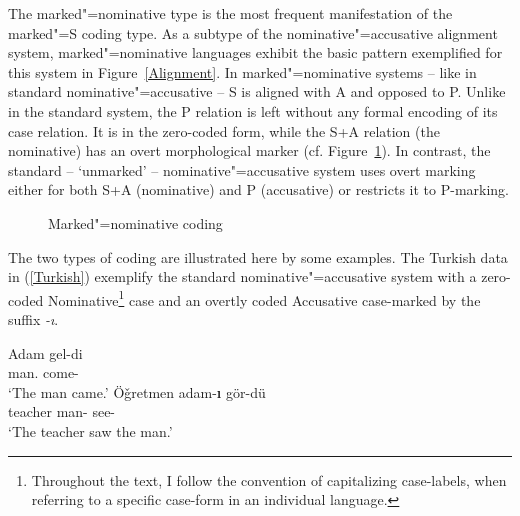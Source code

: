 The marked"=nominative  type is the most frequent manifestation of the marked"=S coding type. 
As a subtype of the nominative"=accusative alignment system, marked"=nominative languages exhibit the basic pattern exemplified for this system in Figure~\ref{Alignment}. 
In marked"=nominative systems -- like in standard nominative"=accusative -- S is aligned with A and opposed to P. 
Unlike in the standard system, the P relation is left without any formal encoding of its case relation. 
It is in the zero-coded form, while the S+A relation (the nominative) has an overt morphological marker (cf. Figure~\ref{MN alignment}). 
In contrast, the standard -- `unmarked' -- nominative"=accusative system uses overt marking either for both S+A (nominative) and P (accusative) or restricts it to P-marking. 

\begin{figure}[h]\begin{center}
\caption{Marked"=nominative coding}\label{MN alignment}
\end{center}
\end{figure}

The two types of coding are illustrated here by some examples.
The Turkish data in (\ref{Turkish}) exemplify the standard nominative"=accusative system with a zero-coded Nominative\footnote{Throughout the text, I follow the convention of capitalizing case-labels, when referring to a specific case-form in an individual language.}  case and an overtly coded Accusative case-marked by the suffix \emph{-\i}. 
\enlargethispage{2\baselineskip}

\begin{exe}\ex\label{Turkish}
\begin{xlist}
\ex\label{TurkishS}\gll Adam gel-di\\
man.{\nom{}} come-\pst{}\\
\glt `The man came.'
\ex\label{TurkishAP}\gll Ö\v{g}retmen adam-\textbf{\i}{} gör-dü\\
teacher man-\acc{} see-\pst{}\\
\glt `The teacher saw the man.'
\end{xlist}
\end{exe}

